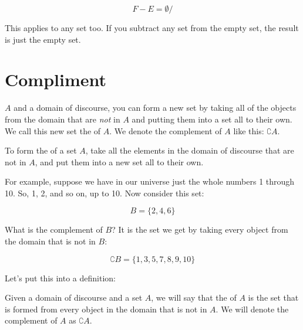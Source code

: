 \documentclass[../../../main.tex]{subfiles}
\begin{document}
\begin{equation*}
  F - E = \emptyset/
\end{equation*}

This applies to any set too. If you subtract any set from the empty set, the result is just the empty set.

\section{Compliment}

 $A$ and a domain of discourse, you can form a new set by taking all of the objects from the domain that are \emph{not} in $A$ and putting them into a set all to their own. We call this new set the  of $A$. We denote the complement of $A$ like this: $\complement{A}$.

\begin{terminology}
  To form the  of a set $A$, take all the elements in the domain of discourse that are not in $A$, and put them into a new set all to their own.
\end{terminology}

For example, suppose we have in our universe just the whole numbers 1 through 10. So, 1, 2, and so on, up to 10. Now consider this set:

\begin{equation*}
  B = \{ 2, 4, 6 \}
\end{equation*}

What is the complement of $B$? It is the set we get by taking every object from the domain that is not in $B$:

\begin{equation*}
  \complement{B} = \{ 1, 3, 5, 7, 8, 9, 10 \}
\end{equation*}

Let's put this into a definition:

\begin{fdefinition}[Complement]
  Given a domain of discourse and a set $A$, we will say that the  of $A$ is the set that is formed from every object in the domain that is not in $A$. We will denote the complement of $A$ as $\complement{A}$.
\end{fdefinition}



\end{document}
